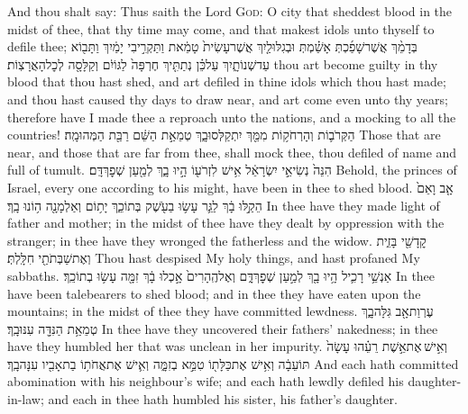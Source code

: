 {And thou shalt say: Thus saith the Lord \textsc{God}: O city that sheddest blood in the midst of thee, that thy time may come, and that makest idols unto thyself to defile thee;}
{בְּדָמֵ֨ךְ אֲשֶׁר\maqqaf שָׁפַ֜כְתְּ אָשַׁ֗מְתְּ וּבְגִלּוּלַ֤יִךְ אֲשֶׁר\maqqaf עָשִׂית֙ טָמֵ֔את וַתַּקְרִ֣יבִי יָמַ֔יִךְ וַתָּב֖וֹא עַד\maqqaf שְׁנוֹתָ֑יִךְ עַל\maqqaf כֵּ֗ן נְתַתִּ֤יךְ חֶרְפָּה֙ לַגּוֹיִ֔ם וְקַלָּסָ֖ה לְכׇל\maqqaf הָאֲרָצֽוֹת׃}
{thou art become guilty in thy blood that thou hast shed, and art defiled in thine idols which thou hast made; and thou hast caused thy days to draw near, and art come even unto thy years; therefore have I made thee a reproach unto the nations, and a mocking to all the countries!}
{הַקְּרֹב֛וֹת וְהָרְחֹק֥וֹת מִמֵּ֖ךְ יִתְקַלְּסוּ\maqqaf בָ֑ךְ טְמֵאַ֣ת הַשֵּׁ֔ם רַבַּ֖ת הַמְּהוּמָֽה׃}
{Those that are near, and those that are far from thee, shall mock thee, thou defiled of name and full of tumult.}
{הִנֵּה֙ נְשִׂיאֵ֣י יִשְׂרָאֵ֔ל אִ֥ישׁ לִזְרֹע֖וֹ הָ֣יוּ בָ֑ךְ לְמַ֖עַן שְׁפׇךְ\maqqaf דָּֽם׃}
{Behold, the princes of Israel, every one according to his might, have been in thee to shed blood.}
{אָ֤ב וָאֵם֙ הֵקַ֣לּוּ בָ֔ךְ לַגֵּ֛ר עָשׂ֥וּ בַעֹ֖שֶׁק בְּתוֹכֵ֑ךְ יָת֥וֹם וְאַלְמָנָ֖ה ה֥וֹנוּ בָֽךְ׃}
{In thee have they made light of father and mother; in the midst of thee have they dealt by oppression with the stranger; in thee have they wronged the fatherless and the widow.}
{קׇדָשַׁ֖י בָּזִ֑ית וְאֶת\maqqaf שַׁבְּתֹתַ֖י חִלָּֽלְתְּ׃}
{Thou hast despised My holy things, and hast profaned My sabbaths.}
{אַנְשֵׁ֥י רָכִ֛יל הָ֥יוּ בָ֖ךְ לְמַ֣עַן שְׁפׇךְ\maqqaf דָּ֑ם וְאֶל\maqqaf הֶֽהָרִים֙ אָ֣כְלוּ בָ֔ךְ זִמָּ֖ה עָשׂ֥וּ בְתוֹכֵֽךְ׃}
{In thee have been talebearers to shed blood; and in thee they have eaten upon the mountains; in the midst of thee they have committed lewdness.}
{עֶרְוַת\maqqaf אָ֖ב גִּלָּה\maqqaf בָ֑ךְ טְמֵאַ֥ת הַנִּדָּ֖ה עִנּוּ\maqqaf בָֽךְ׃}
{In thee have they uncovered their fathers’ nakedness; in thee have they humbled her that was unclean in her impurity.}
{וְאִ֣ישׁ \legarmeh  אֶת\maqqaf אֵ֣שֶׁת רֵעֵ֗הוּ עָשָׂה֙ תּוֹעֵבָ֔ה וְאִ֥ישׁ אֶת\maqqaf כַּלָּת֖וֹ טִמֵּ֣א בְזִמָּ֑ה וְאִ֛ישׁ אֶת\maqqaf אֲחֹת֥וֹ בַת\maqqaf אָבִ֖יו עִנָּה\maqqaf בָֽךְ׃}
{And each hath committed abomination with his neighbour’s wife; and each hath lewdly defiled his daughter-in-law; and each in thee hath humbled his sister, his father’s daughter.}
